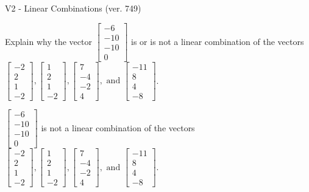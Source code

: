\begin{exercise}
  \begin{exerciseTitle}V2 - Linear Combinations (ver. 749)\end{exerciseTitle}
  \begin{exerciseStatement}
    Explain why the vector \(\left[\begin{array}{c}
-6 \\
-10 \\
-10 \\
0
\end{array}\right]\)  is or is not a linear 
	combination of the vectors \(\left[\begin{array}{c}
-2 \\
2 \\
1 \\
-2
\end{array}\right] , \left[\begin{array}{c}
1 \\
2 \\
1 \\
-2
\end{array}\right] , \left[\begin{array}{c}
7 \\
-4 \\
-2 \\
4
\end{array}\right] , \text{ and } \left[\begin{array}{c}
-11 \\
8 \\
4 \\
-8
\end{array}\right]\).
	


  \end{exerciseStatement}
  \begin{exerciseAnswer}
   \(\left[\begin{array}{c}
-6 \\
-10 \\
-10 \\
0
\end{array}\right]\) 
  	 is not  
	a linear combination of the vectors \(\left[\begin{array}{c}
-2 \\
2 \\
1 \\
-2
\end{array}\right] , \left[\begin{array}{c}
1 \\
2 \\
1 \\
-2
\end{array}\right] , \left[\begin{array}{c}
7 \\
-4 \\
-2 \\
4
\end{array}\right] , \text{ and } \left[\begin{array}{c}
-11 \\
8 \\
4 \\
-8
\end{array}\right]\).


\end{exerciseAnswer}
\end{exercise}
